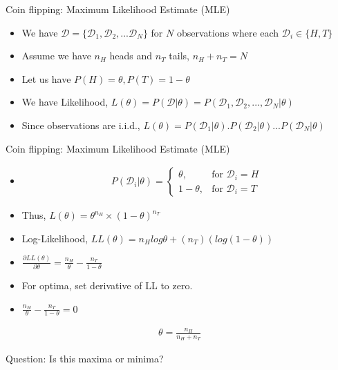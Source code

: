 \documentclass{beamer}
\newcommand{\data}{\mathcal{D}}
\begin{document}
\begin{frame}{Coin flipping: Maximum Likelihood Estimate (MLE)}
\begin{itemize}
	\item We have $\mathcal{D} = \{\data_1, \data_2, ...\data_{N}\}$ for $N$ observations where each $\mathcal{D}_i \in \{H, T\}$
	\item Assume we have $n_H$ heads and $n_T$ tails, $n_H + n_T = N$
	\item Let us have $P(H) = \theta, P(T) = 1-\theta$
	\item We have Likelihood, $L(\theta) = P(\mathcal{D}|\theta) = P(\data_1, \data_2, ..., \data_N|\theta)$
	\item Since observations are i.i.d., $L(\theta) = P(\data_1|\theta).P(\data_2|\theta) ... P(\data_N|\theta)$
\end{itemize}

\end{frame}


\begin{frame}{Coin flipping: Maximum Likelihood Estimate (MLE)}
\begin{itemize}
	\item  
\begin{align*}  
P(\data_i|\theta) =  \left
\{\begin{array}{lr} \theta, & \text{for~} \data_i =H \\
1-\theta, & \text{for~} \data_i = T
\end{array}\right.\
\end{align*}  
\item Thus, $L(\theta) = \theta^{n_H}\times (1-\theta)^{n_T}$
\item Log-Likelihood, $LL(\theta) = n_Hlog\theta + (n_T)(log(1-\theta))$
\item $\frac{\partial LL(\theta)}{\partial \theta} = \frac{n_H}{\theta} - \frac{n_T}{1-\theta}$
\item  For optima, set derivative of LL to zero.

\item 	$\frac{n_H}{\theta} - \frac{n_T}{1-\theta} = 0 $
\end{itemize}
	\begin{align*}
	 \theta = \frac{n_H}{n_H + n_T}
	\end{align*}

Question: Is this maxima or minima?

\end{frame}
\end{document}
